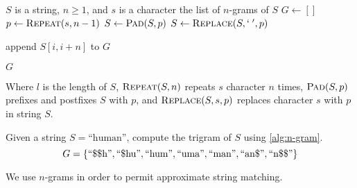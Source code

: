 
		\begin{algorithm}[H]
			\caption{\(\textsc{N-Gram}(S, n, s)\)}
			\label{alg:n-gram}
			
			\begin{singlespaced}
				\begin{algorithmic}[1]
					\REQUIRE \(S\) is a string, \(n \ge 1\), and \(s\) is a character
					\ENSURE the list of \(n\)-grams of \(S\)
					\medskip
					\STATE \(G \leftarrow []\)\label{alg:n-gram:G}
					\STATE \(p \leftarrow \textsc{Repeat}(s, n - 1)\)
					\STATE \(S \leftarrow \textsc{Pad}(S, p)\)
					\STATE \(S \leftarrow \textsc{Replace}(S, `\;', p)\)\label{alg:n-gram:S}
					
						\STATE append \(S[i, i + n]\) to \(G\)
					\ENDFOR
					
					\RETURN \(G\)
					\medskip
					\medskip
				\end{algorithmic}
			\end{singlespaced}
		\end{algorithm}
		
		
		Where \(l\) is the length of \(S\), \(\textsc{Repeat}(S, n)\) repeats \(s\) character \(n\) times, \(\textsc{Pad}(S, p)\) prefixes and postfixes \(S\) with \(p\), and \(\textsc{Replace}(S, s, p)\) replaces character \(s\) with \(p\) in string \(S\).
		
		\begin{ex}
		\label{ex:ngram}
			Given a string \(S = \text{``human''}\), compute the trigram of \(S\) using \vref{alg:n-gram}.
			\[
				G = \{
					\text{``\char"24\char"24h''},
					\text{``\char"24hu''},
					\text{``hum''},
					\text{``uma''},
					\text{``man''},
					\text{``an\char"24''},
					\text{``n\char"24\char"24''}
				\}
			\]
		\end{ex}
		
		We use \(n\)-grams in order to permit approximate string matching.
		
